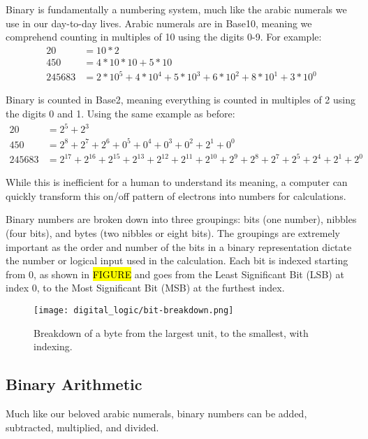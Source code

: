 Binary is fundamentally a numbering system, much like the arabic numerals we use in our day-to-day lives.
Arabic numerals are in Base10, meaning we comprehend counting in multiples of 10 using the digits 0-9. For example:
\begin{align*}
    20     &= 10*2 \\
    450    &= 4*10*10 + 5*10 \\
    245683 &= 2*10^5 + 4*10^4 + 5*10^3 + 6*10^2 + 8*10^1 + 3*10^0
\end{align*}

Binary is counted in Base2, meaning everything is counted in multiples of 2 using the digits 0 and 1. Using the same example as before:
\begin{align*}
    20     &= 2^5 + 2^3 \\
    450    &= 2^8 + 2^7 + 2^6 + 0^5 + 0^4 + 0^3 + 0^2 + 2^1 + 0^0 \\
    245683 &= 2^{17} + 2^{16} + 2^{15} + 2^{13} + 2^{12} + 2^{11} + 2^{10} + 2^9 + 2^8 + 2^7 + 2^5 + 2^4 + 2^1 + 2^0
\end{align*}
        
While this is inefficient for a human to understand its meaning, a computer can quickly transform this on/off pattern of electrons into numbers for calculations.

Binary numbers are broken down into three groupings: bits (one number), nibbles (four bits), and bytes (two nibbles or eight bits). 
The groupings are extremely important as the order and number of the bits in a binary representation dictate the number or logical input used in the calculation.
Each bit is indexed starting from 0, as shown in \hl{FIGURE} and goes from the Least Significant Bit (LSB) at index 0, to the Most Significant Bit (MSB) at the furthest index. 

\begin{figure*}
    \texttt{[image: digital\_logic/bit-breakdown.png]}
    \caption[Byte Breakdown]{Breakdown of a byte from the largest unit, to the smallest, with indexing.}
\end{figure*}

    \subsection{Binary Arithmetic}
    Much like our beloved arabic numerals, binary numbers can be added, subtracted, multiplied, and divided.

